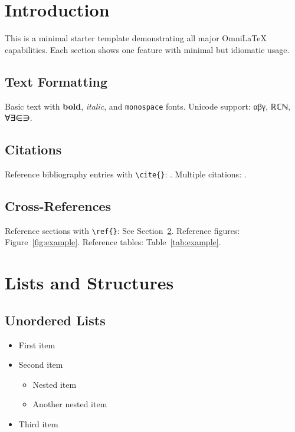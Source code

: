 \documentclass[
    language=english,
    doctype=book,              %
    institution=none,        %
    oneside,                 %
    loadGlossaries=true,          %
]{../../omnilatex}
\begin{document}
\maketitle

\tableofcontents

\chapter{Introduction}

This is a minimal starter template demonstrating all major OmniLaTeX capabilities.
Each section shows one feature with minimal but idiomatic usage.

\section{Text Formatting}

Basic text with \textbf{bold}, \textit{italic}, and \texttt{monospace} fonts.
Unicode support: αβγ, ℝℂℕ, ∀∃∈∋.

\section{Citations}

Reference bibliography entries with \verb|\cite{}|: \cite{einstein1905}.
Multiple citations: \cite{birdNaturalLanguageProcessing2009,goossensLaTeXCompanion1993}.

\section{Cross-References}

Reference sections with \verb|\ref{}|: See Section~\ref{sec:lists}.
Reference figures: Figure~\ref{fig:example}.
Reference tables: Table~\ref{tab:example}.

\chapter{Lists and Structures}
\label{sec:lists}

\section{Unordered Lists}

\begin{itemize}
	\item First item
	\item Second item
	      \begin{itemize}
		      \item Nested item
		      \item Another nested item
	      \end{itemize}
	\item Third item
\end{itemize}
\end{document}

